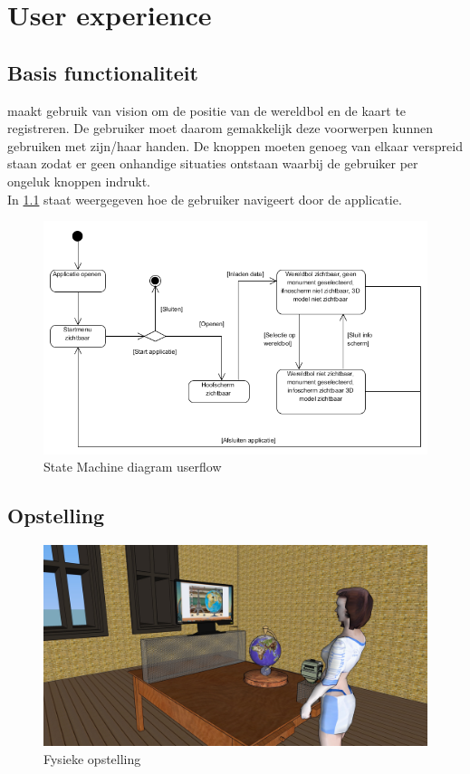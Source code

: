 \chapter{User experience} \label{cha:userexperience}

\section{Basis functionaliteit} \label{sec:basis}
\projectname maakt gebruik van vision om de positie van de wereldbol en de kaart te registreren. De gebruiker moet daarom gemakkelijk deze voorwerpen kunnen gebruiken met zijn/haar handen. De knoppen moeten genoeg van elkaar verspreid staan zodat er geen onhandige situaties ontstaan waarbij de gebruiker per ongeluk knoppen indrukt.\\
In \cref{fig:statemachine1} staat weergegeven hoe de gebruiker navigeert door de applicatie.
\begin{figure}[h]
	\includegraphics[width=130mm]{figs/state_machine1.png}
	\caption{State Machine diagram userflow}
	\label{fig:statemachine1}
\end{figure}


\newpage
\section{Opstelling} \label{sec:setup}
\begin{figure}[h]
	\includegraphics[width=130mm]{figs/screen1.jpg}
	\caption{Fysieke opstelling}
	\label{fig:screen1}
\end{figure}

